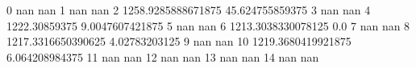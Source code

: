 0 nan nan
1 nan nan
2 1258.9285888671875 45.624755859375
3 nan nan
4 1222.30859375 9.0047607421875
5 nan nan
6 1213.3038330078125 0.0
7 nan nan
8 1217.3316650390625 4.02783203125
9 nan nan
10 1219.3680419921875 6.064208984375
11 nan nan
12 nan nan
13 nan nan
14 nan nan
